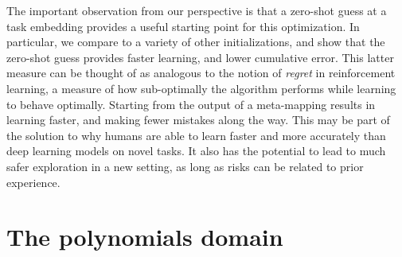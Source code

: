 The important observation from our perspective is that a zero-shot guess at a task embedding provides a useful starting point for this optimization. In particular, we compare to a variety of other initializations, and show that the zero-shot guess provides faster learning, and lower cumulative error. This latter measure can be thought of as analogous to the notion of \emph{regret} in reinforcement learning, a measure of how sub-optimally the algorithm performs while learning to behave optimally. Starting from the output of a meta-mapping results in learning faster, and making fewer mistakes along the way. This may be part of the solution to why humans are able to learn faster and more accurately than deep learning models on novel tasks. It also has the potential to lead to much safer exploration in a new setting, as long as risks can be related to prior experience. \par   

\section{The polynomials domain}


